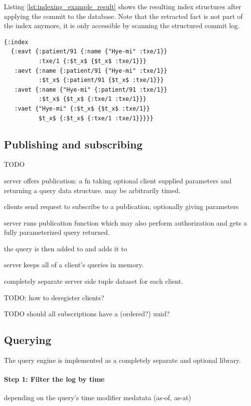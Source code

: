 Listing \ref{lst:indexing_example_result} shows the resulting index structures after applying the commit to the database. Note that the retracted fact is not part of the index anymore, it is only accessible by scanning the structured commit log.

\begin{lstlisting}[label={lst:indexing_example_result}]
{:index
  {:eavt {:patient/91 {:name {"Hye-mi" :txe/1}}
          :txe/1 {:$t_x$ {$t_x$ :txe/1}}}
   :aevt {:name {:patient/91 {"Hye-mi" :txe/1}}
          :$t_x$ {:patient/91 {$t_x$ :txe/1}}}
   :avet {:name {"Hye-mi" {:patient/91 :txe/1}}
          :$t_x$ {$t_x$ {:txe/1 :txe/1}}}
   :vaet {"Hye-mi" {:$t_x$ {$t_x$ :txe/1}}
          $t_x$ {:$t_x$ {:txe/1 :txe/1}}}}}
\end{lstlisting}




\subsection{Publishing and subscribing}

TODO

server offers publication: a fn taking optional client supplied parameters and returning a query data structure. may be arbitrarily timed.

clients send request to subscribe to a publication, optionally giving parameters

server runs publication function which may also perform authorization and gets a fully parameterized query returned.

the query is then added to and adds it to

server keeps all of a client's queries in memory.

completely separate server side tuple dataset for each client.

TODO: how to deregister clients?

TODO should all subscriptions have a (ordered?) uuid?



\subsection{Querying}

The query engine is implemented as a completely separate and optional library.

\paragraph{Step 1: Filter the log by time}
depending on the query's time modifier medatata
(as-of, as-at)

